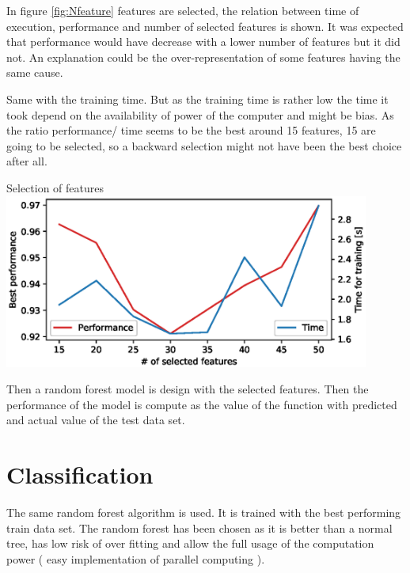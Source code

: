 In figure \ref{fig:Nfeature} features are selected, the relation between time of execution, performance and number of selected features is shown. It was expected that performance would have decrease with a lower number of features but it did not. An explanation could be the over-representation of some features having the same cause.

Same with the training time. But as the training time is rather low the time it took depend on the availability of power of the computer and might be bias. 
As the ratio performance/ time seems to be the best around 15 features, 15 are going to be selected, so a backward selection might not have been the best choice after all. 



\createfigure[h]
  {}
    {Selection of features}
    {\label{fig:Nfeature}}
    {\includegraphics[width = 0.9\textwidth]{figures/Nfeature.eps}}
    {}


Then a random forest model is design with the selected features. Then the performance of the model is compute as the value of the function with predicted and actual value of the test data set.

\section{Classification}
The same random forest algorithm is used. It is trained with the best performing train data set. The random forest has been chosen as it is better than a normal tree, has low risk of over fitting and allow the full usage of the computation power ( easy implementation of parallel computing ).


